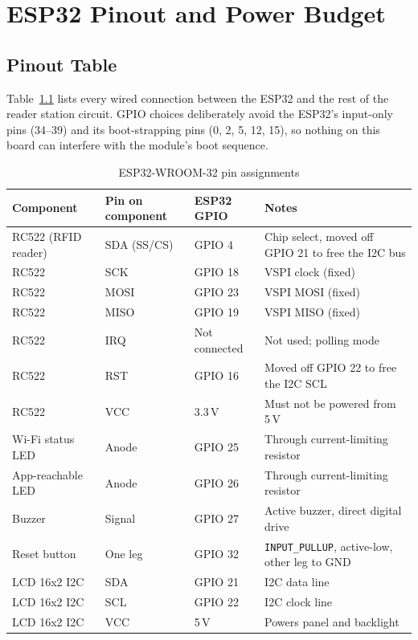 \chapter{ESP32 Pinout and Power Budget}
\label{app:pinout}

\section*{Pinout Table}

Table~\ref{tab:pinout} lists every wired connection between the ESP32 and the rest of the reader station circuit. GPIO choices deliberately avoid the ESP32's input-only pins (34--39) and its boot-strapping pins (0, 2, 5, 12, 15), so nothing on this board can interfere with the module's boot sequence.

\begin{table}[H]
    \centering
    \caption{ESP32-WROOM-32 pin assignments}
    \label{tab:pinout}
    \begin{tabular}{@{}p{3.4cm}p{2.8cm}p{1.8cm}p{5.3cm}@{}}
        \toprule
        \textbf{Component} & \textbf{Pin on component} & \textbf{ESP32 GPIO} & \textbf{Notes} \\
        \midrule
        RC522 (RFID reader) & SDA (SS/CS) & GPIO 4 & Chip select, moved off GPIO 21 to free the I2C bus \\
        RC522 & SCK & GPIO 18 & VSPI clock (fixed) \\
        RC522 & MOSI & GPIO 23 & VSPI MOSI (fixed) \\
        RC522 & MISO & GPIO 19 & VSPI MISO (fixed) \\
        RC522 & IRQ & Not connected & Not used; polling mode \\
        RC522 & RST & GPIO 16 & Moved off GPIO 22 to free the I2C SCL \\
        RC522 & VCC & 3.3\,V & Must not be powered from 5\,V \\
        Wi-Fi status LED & Anode & GPIO 25 & Through current-limiting resistor \\
        App-reachable LED & Anode & GPIO 26 & Through current-limiting resistor \\
        Buzzer & Signal & GPIO 27 & Active buzzer, direct digital drive \\
        Reset button & One leg & GPIO 32 & \texttt{INPUT\_PULLUP}, active-low, other leg to GND \\
        LCD 16x2 I2C & SDA & GPIO 21 & I2C data line \\
        LCD 16x2 I2C & SCL & GPIO 22 & I2C clock line \\
        LCD 16x2 I2C & VCC & 5\,V & Powers panel and backlight \\
        \bottomrule
    \end{tabular}
\end{table}

